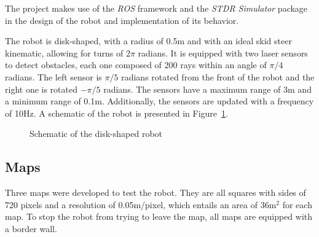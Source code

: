 \documentclass[10pt,journal,compsoc]{IEEEtran}
\begin{document}
The project makes use of the \textit{ROS} framework and the \textit{STDR Simulator} package in the design of the robot and implementation of its behavior.

The robot is disk-shaped, with a radius of 0.5m and with an ideal skid steer kinematic, allowing for turns of $2\pi$ radians. It is equipped with two laser sensors to detect obstacles, each one composed of 200 rays within an angle of $\pi/4$ radians. The left sensor is $\pi/5$ radians rotated from the front of the robot and the right one is rotated $-\pi/5$ radians. The sensors have a maximum range of 3m and a minimum range of 0.1m. Additionally, the sensors are updated with a frequency of 10Hz. A schematic of the robot is presented in Figure~\ref{fig:robot}.


\begin{figure}[thpb]
\centering
{}
\caption{Schematic of the disk-shaped robot}
\label{fig:robot}
\end{figure}


\subsection{Maps}
Three maps were developed to test the robot. They are all squares with sides of 720 pixels and a resolution of 0.05m/pixel, which entails an area of 36m$^2$ for each map. To stop the robot from trying to leave the map, all maps are equipped with a border wall.
\end{document}
